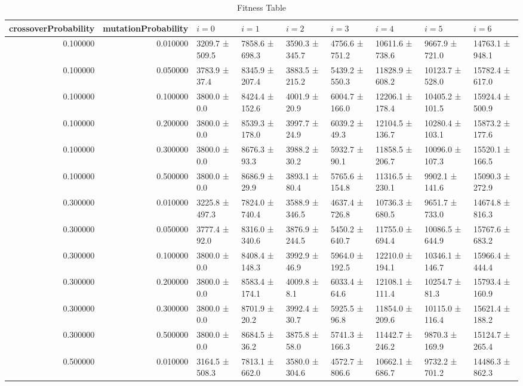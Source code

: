 \begin{table}
\caption{Fitness Table}
\label{tab:fitness_table}
\begin{tabular}{rrlllllll}
\toprule
crossoverProbability & mutationProbability & \(i = 0\) & \(i = 1\) & \(i = 2\) & \(i = 3\) & \(i = 4\) & \(i = 5\) & \(i = 6\) \\
\midrule
0.100000 & 0.010000 & 3209.7 ± 509.5 & 7858.6 ± 698.3 & 3590.3 ± 345.7 & 4756.6 ± 751.2 & 10611.6 ± 738.6 & 9667.9 ± 721.0 & 14763.1 ± 948.1 \\
0.100000 & 0.050000 & 3783.9 ± 37.4 & 8345.9 ± 207.4 & 3883.5 ± 215.2 & 5439.2 ± 550.3 & 11828.9 ± 608.2 & 10123.7 ± 528.0 & 15782.4 ± 617.0 \\
0.100000 & 0.100000 & 3800.0 ± 0.0 & 8424.4 ± 152.6 & 4001.9 ± 20.9 & 6004.7 ± 166.0 & 12206.1 ± 178.4 & 10405.2 ± 101.5 & 15924.4 ± 500.9 \\
0.100000 & 0.200000 & 3800.0 ± 0.0 & 8539.3 ± 178.0 & 3997.7 ± 24.9 & 6039.2 ± 49.3 & 12104.5 ± 136.7 & 10280.4 ± 103.1 & 15873.2 ± 177.6 \\
0.100000 & 0.300000 & 3800.0 ± 0.0 & 8676.3 ± 93.3 & 3988.2 ± 30.2 & 5932.7 ± 90.1 & 11858.5 ± 206.7 & 10096.0 ± 107.3 & 15520.1 ± 166.5 \\
0.100000 & 0.500000 & 3800.0 ± 0.0 & 8686.9 ± 29.9 & 3893.1 ± 80.4 & 5765.6 ± 154.8 & 11316.5 ± 230.1 & 9902.1 ± 141.6 & 15090.3 ± 272.9 \\
0.300000 & 0.010000 & 3225.8 ± 497.3 & 7824.0 ± 740.4 & 3588.9 ± 346.5 & 4637.4 ± 726.8 & 10736.3 ± 680.5 & 9651.7 ± 733.0 & 14674.8 ± 816.3 \\
0.300000 & 0.050000 & 3777.4 ± 92.0 & 8316.0 ± 340.6 & 3876.9 ± 244.5 & 5450.2 ± 640.7 & 11755.0 ± 694.4 & 10086.5 ± 644.9 & 15767.6 ± 683.2 \\
0.300000 & 0.100000 & 3800.0 ± 0.0 & 8408.4 ± 148.3 & 3992.9 ± 46.9 & 5964.0 ± 192.5 & 12210.0 ± 194.1 & 10346.1 ± 146.7 & 15966.4 ± 444.4 \\
0.300000 & 0.200000 & 3800.0 ± 0.0 & 8583.4 ± 174.1 & 4009.8 ± 8.1 & 6033.4 ± 64.6 & 12108.1 ± 111.4 & 10254.7 ± 81.3 & 15793.4 ± 160.9 \\
0.300000 & 0.300000 & 3800.0 ± 0.0 & 8701.9 ± 20.2 & 3992.4 ± 30.7 & 5925.5 ± 96.8 & 11854.0 ± 209.6 & 10115.0 ± 116.4 & 15621.4 ± 188.2 \\
0.300000 & 0.500000 & 3800.0 ± 0.0 & 8684.5 ± 36.2 & 3875.8 ± 58.0 & 5741.3 ± 166.3 & 11442.7 ± 246.2 & 9870.3 ± 169.9 & 15124.7 ± 265.4 \\
0.500000 & 0.010000 & 3164.5 ± 508.3 & 7813.1 ± 662.0 & 3580.0 ± 304.6 & 4572.7 ± 806.6 & 10662.1 ± 686.7 & 9732.2 ± 701.2 & 14486.3 ± 862.3 \\

\end{tabular}
\end{table}
